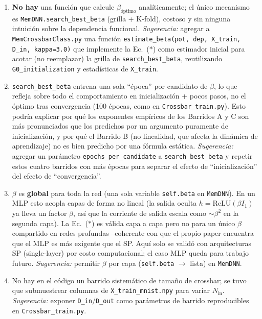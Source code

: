 \documentclass[11pt]{article}
\begin{document}
\begin{enumerate}
  \item \textbf{No hay} una función que calcule $\beta_{\text{óptimo}}$
    analíticamente; el único mecanismo es \texttt{MemDNN.search\_best\_beta} (grilla
    + K-fold), costoso y sin ninguna intuición sobre la dependencia funcional.
    \emph{Sugerencia:} agregar a \texttt{MemCrossbarClass.py} una función
    \texttt{estimate\_beta(pot, dep, X\_train, D\_in, kappa=3.0)} que implemente la
    Ec.~($\ast$) como estimador inicial para acotar (no reemplazar) la grilla de
    \texttt{search\_best\_beta}, reutilizando \texttt{G0\_initialization} y
    estadísticas de \texttt{X\_train}.

  \item \texttt{search\_best\_beta} entrena una sola ``época'' por candidato de
    $\beta$, lo que refleja sobre todo el comportamiento en inicialización + pocos
    pasos, no el óptimo tras convergencia (100 épocas, como en
    \texttt{Crossbar\_train.py}). Esto podría explicar por qué los exponentes
    empíricos de los Barridos A y C son más pronunciados que los predichos por un
    argumento puramente de inicialización, y por qué el Barrido B (no linealidad,
    que afecta la dinámica de aprendizaje) no es bien predicho por una fórmula
    estática. \emph{Sugerencia:} agregar un parámetro \texttt{epochs\_per\_candidate}
    a \texttt{search\_best\_beta} y repetir estos cuatro barridos con más épocas
    para separar el efecto de ``inicialización'' del efecto de ``convergencia''.

  \item $\beta$ es \textbf{global} para toda la red (una sola variable
    \texttt{self.beta} en \texttt{MemDNN}). En un MLP esto acopla capas de forma no
    lineal (la salida oculta $h=\mathrm{ReLU}(\beta I_1)$ ya lleva un factor
    $\beta$, así que la corriente de salida escala como $\sim\beta^2$ en la segunda
    capa). La Ec.~($\ast$) es válida capa a capa pero no para un único $\beta$
    compartido en redes profundas --coherente con que el propio paper encuentra que
    el MLP es más exigente que el SP. Aquí solo se validó con arquitecturas SP
    (single-layer) por costo computacional; el caso MLP queda para trabajo futuro.
    \emph{Sugerencia:} permitir $\beta$ por capa (\texttt{self.beta} $\to$ lista) en
    \texttt{MemDNN}.

  \item No hay en el código un barrido sistemático de tamaño de crossbar; se tuvo
    que submuestrear columnas de \texttt{X\_train\_mnist.npy} para variar
    $N_{\text{in}}$. \emph{Sugerencia:} exponer \texttt{D\_in}/\texttt{D\_out} como
    parámetros de barrido reproducibles en \texttt{Crossbar\_train.py}.


\end{enumerate}
\end{document}
